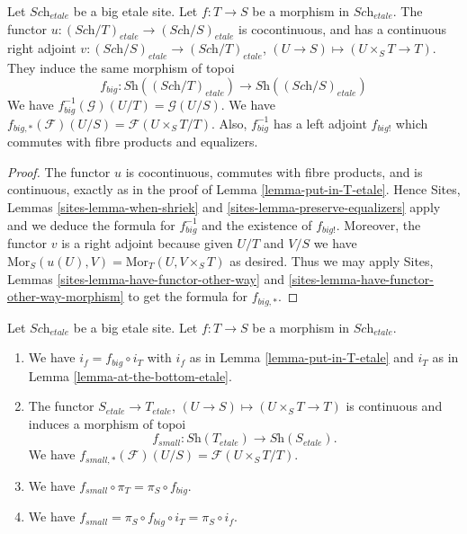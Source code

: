 \begin{lemma}
\label{lemma-morphism-big-etale}
Let $\textit{Sch}_{etale}$ be a big etale site.
Let $f : T \to S$ be a morphism in $\textit{Sch}_{etale}$.
The functor $u : (\textit{Sch}/T)_{etale} \to (\textit{Sch}/S)_{etale}$
is cocontinuous, and has a continuous right adjoint
$v : (\textit{Sch}/S)_{etale} \to (\textit{Sch}/T)_{etale}$,
$(U \to S) \mapsto (U \times_S T \to T)$. They induce the same morphism
of topoi
$$
f_{big} :
\textit{Sh}((\textit{Sch}/T)_{etale})
\longrightarrow
\textit{Sh}((\textit{Sch}/S)_{etale})
$$
We have $f_{big}^{-1}(\mathcal{G})(U/T) = \mathcal{G}(U/S)$.
We have $f_{big, *}(\mathcal{F})(U/S) = \mathcal{F}(U\times_ST/T)$.
Also, $f_{big}^{-1}$ has a left adjoint $f_{big!}$ which commutes with
fibre products and equalizers.
\end{lemma}

\begin{proof}
The functor $u$ is cocontinuous, commutes with fibre products,
and is continuous, exactly as in the proof of Lemma \ref{lemma-put-in-T-etale}.
Hence Sites, Lemmas \ref{sites-lemma-when-shriek}
and \ref{sites-lemma-preserve-equalizers}
apply and we deduce the formula
for $f_{big}^{-1}$ and the existence of $f_{big!}$. Moreover,
the functor $v$ is a right adjoint because given $U/T$ and $V/S$
we have $\text{Mor}_S(u(U), V) = \text{Mor}_T(U, V\times_S T)$
as desired. Thus we may apply
Sites, Lemmas \ref{sites-lemma-have-functor-other-way} and
\ref{sites-lemma-have-functor-other-way-morphism} to get the
formula for $f_{big, *}$.
\end{proof}

\begin{lemma}
\label{lemma-morphism-big-small-etale}
Let $\textit{Sch}_{etale}$ be a big etale site.
Let $f : T \to S$ be a morphism in $\textit{Sch}_{etale}$.
\begin{enumerate}
\item We have $i_f = f_{big} \circ i_T$ with $i_f$ as in
Lemma \ref{lemma-put-in-T-etale} and $i_T$ as in
Lemma \ref{lemma-at-the-bottom-etale}.
\item The functor $S_{etale} \to T_{etale}$,
$(U \to S) \mapsto (U \times_S T \to T)$ is continuous and induces
a morphism of topoi
$$
f_{small} :
\textit{Sh}(T_{etale})
\longrightarrow
\textit{Sh}(S_{etale}).
$$
We have $f_{small, *}(\mathcal{F})(U/S) = \mathcal{F}(U\times_S T/T)$.
\item We have $f_{small} \circ \pi_T = \pi_S \circ f_{big}$.
\item We have $f_{small} = \pi_S \circ f_{big} \circ i_T = \pi_S \circ i_f$.
\end{enumerate}
\end{lemma}

